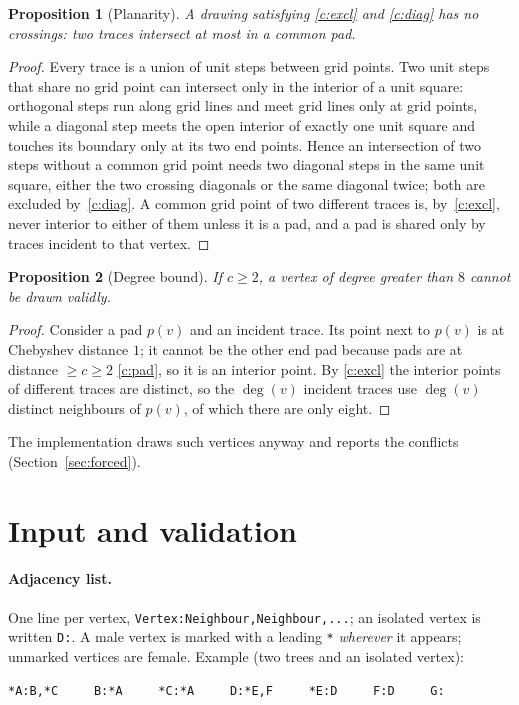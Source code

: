 \documentclass[11pt,a4paper]{article}
\newtheorem{proposition}{Proposition}
\theoremstyle{remark}
\newcommand{\pos}{p}
\begin{document}
\begin{proposition}[Planarity]\label{prop:planar}
A drawing satisfying \ref{c:excl} and \ref{c:diag} has no crossings: two traces intersect at most in a common pad.
\end{proposition}
\begin{proof}
Every trace is a union of unit steps between grid points. Two unit steps that share no grid point can intersect
only in the interior of a unit square: orthogonal steps run along grid lines and meet grid lines only at grid
points, while a diagonal step meets the open interior of exactly one unit square and touches its boundary only at its
two end points. Hence an intersection of two steps without a common grid point needs two diagonal steps in the same
unit square, either the two crossing diagonals or the same diagonal twice; both are excluded by~\ref{c:diag}. A
common grid point of two different traces is, by~\ref{c:excl}, never interior to either of them unless it is a pad,
and a pad is shared only by traces incident to that vertex.
\end{proof}

\begin{proposition}[Degree bound]\label{prop:degree}
If $c\ge 2$, a vertex of degree greater than $8$ cannot be drawn validly.
\end{proposition}
\begin{proof}
Consider a pad $\pos(v)$ and an incident trace. Its point next to $\pos(v)$ is at Chebyshev distance $1$; it cannot
be the other end pad because pads are at distance $\ge c\ge2$ \ref{c:pad}, so it is an interior point. By
\ref{c:excl} the interior points of different traces are distinct, so the $\deg(v)$ incident traces use
$\deg(v)$ distinct neighbours of $\pos(v)$, of which there are only eight.
\end{proof}
The implementation draws such vertices anyway and reports the conflicts (Section~\ref{sec:forced}).

\section{Input and validation}\label{sec:input}

\paragraph{Adjacency list.} One line per vertex, \texttt{Vertex:Neighbour,Neighbour,...}; an isolated vertex is
written \texttt{D:}. A male vertex is marked with a leading \texttt{*} \emph{wherever} it appears; unmarked vertices
are female. Example (two trees and an isolated vertex):
\begin{lstlisting}
*A:B,*C     B:*A     *C:*A     D:*E,F     *E:D     F:D     G:
\end{lstlisting}
\end{document}
